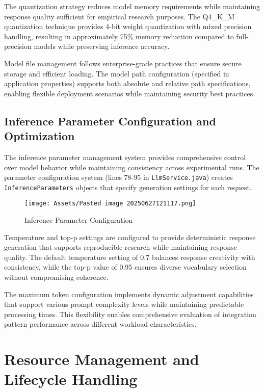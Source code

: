 The quantization strategy reduces model memory requirements while maintaining response quality sufficient for empirical research purposes. The Q4\_K\_M quantization technique provides 4-bit weight quantization with mixed precision handling, resulting in approximately 75\% memory reduction compared to full-precision models while preserving inference accuracy.

Model file management follows enterprise-grade practices that ensure secure storage and efficient loading. The model path configuration (specified in application properties) supports both absolute and relative path specifications, enabling flexible deployment scenarios while maintaining security best practices.

\subsection{Inference Parameter Configuration and Optimization}

The inference parameter management system provides comprehensive control over model behavior while maintaining consistency across experimental runs. The parameter configuration system (lines 78-95 in \texttt{LlmService.java}) creates \texttt{InferenceParameters} objects that specify generation settings for each request.

\begin{figure}[H]
    \centering
    \texttt{[image: Assets/Pasted image 20250627121117.png]}
    \caption{Inference Parameter Configuration}
\end{figure}

Temperature and top-p settings are configured to provide deterministic response generation that supports reproducible research while maintaining response quality. The default temperature setting of 0.7 balances response creativity with consistency, while the top-p value of 0.95 ensures diverse vocabulary selection without compromising coherence.

The maximum token configuration implements dynamic adjustment capabilities that support various prompt complexity levels while maintaining predictable processing times. This flexibility enables comprehensive evaluation of integration pattern performance across different workload characteristics.


\section{Resource Management and Lifecycle Handling}


